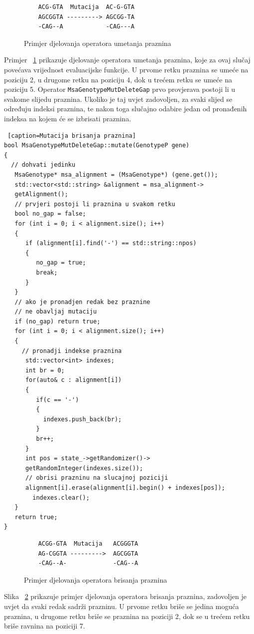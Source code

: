 \documentclass[times, utf8, zavrsni, numeric]{fer}
\begin{document}
  \begin{figure} [httb]
 	\begin{verbatim}
 	ACG-GTA  Mutacija  AC-G-GTA
 	AGCGGTA ---------> AGCGG-TA
 	-CAG--A            -CAG---A
 	\end{verbatim}
 	\caption{Primjer djelovanja operatora umetanja praznina}
 	\label{fig:umetanje}
 \end{figure}
 Primjer ~\ref{fig:umetanje} prikazuje djelovanje operatora umetanja praznina, koje za ovaj slučaj povećava vrijednost evaluacijske funkcije. U prvome retku praznina se umeće na poziciju 2, u drugome retku na poziciju 4, dok u trećem retku se umeće na poziciju 5.
  Operator \texttt{MsaGenotypeMutDeleteGap} prvo provjerava postoji li u svakome slijedu praznina. Ukoliko je taj uvjet zadovoljen, za svaki slijed se određuju indeksi praznina, te nakon toga slučajno odabire jedan od pronađenih indeksa na kojem će se izbrisati praznina.
  \begin{lstlisting} [caption=Mutacija brisanja praznina]
bool MsaGenotypeMutDeleteGap::mutate(GenotypeP gene)
{
  // dohvati jedinku
   MsaGenotype* msa_alignment = (MsaGenotype*) (gene.get());
   std::vector<std::string> &alignment = msa_alignment->
   getAlignment();
   // prvjeri postoji li praznina u svakom retku
   bool no_gap = false;
   for (int i = 0; i < alignment.size(); i++)
   {
      if (alignment[i].find('-') == std::string::npos)
      {
         no_gap = true;
         break;
      }
   }
   // ako je pronadjen redak bez praznine
   // ne obavljaj mutaciju
   if (no_gap) return true;
   for (int i = 0; i < alignment.size(); i++)
   {
     // pronadji indekse praznina
      std::vector<int> indexes;
      int br = 0;
      for(auto& c : alignment[i])
      {
         if(c == '-')
         {
           indexes.push_back(br);
         }
         br++;
      }
      int pos = state_->getRandomizer()->
      getRandomInteger(indexes.size());
      // obrisi prazninu na slucajnoj poziciji
      alignment[i].erase(alignment[i].begin() + indexes[pos]);
	    indexes.clear();
   }
   return true;
}
  \end{lstlisting}
  
  
  \begin{figure} [httb]
  	\begin{verbatim}
  	ACGG-GTA  Mutacija   ACGGGTA
  	AG-CGGTA --------->  AGCGGTA
  	-CAG--A-             -CAG--A
  	\end{verbatim}
  	\caption{Primjer djelovanja operatora brisanja praznina}
  	\label{fig:brisanje1}
  \end{figure}
 Slika ~\ref{fig:brisanje1} prikazuje primjer djelovanja operatora brisanja praznina, zadovoljen je uvjet da svaki redak sadrži prazninu. U prvome retku briše se jedina moguća praznina, u drugome retku briše se praznina na poziciji 2, dok se u trećem retku briše ravnina na poziciji 7.
  
\end{document}
